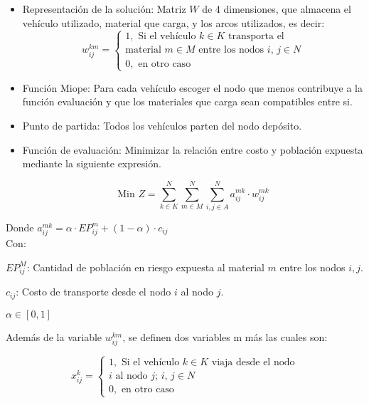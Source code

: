 \documentclass[conference]{IEEEtran}
\begin{document}
\begin{itemize}
    \item Representaci\'on de la soluci\'on: Matriz $W$ de 4 dimensiones, que almacena el veh\'iculo utilizado, material que carga, y los arcos utilizados, es decir:
   \\
   \begin{equation*}
        w^{km}_{ij} =     
    \begin{cases}
      1, \text{ Si el  veh\'iculo $k$} \in \text{$K$ transporta   el} \\  \text{material $m$} \in \text{$M$} \text{   entre los nodos $i$, $j$} \in \text{$N$}
      \\
      0, \text{ en otro caso}
    \end{cases}
    \end{equation*}
    \item Funci\'on Miope: Para cada veh\'iculo escoger el nodo que menos contribuye a la funci\'on evaluaci\'on y que los materiales que carga sean compatibles entre si.
    \item Punto de partida: Todos los veh\'iculos parten del nodo dep\'osito.
    \item Funci\'on de evaluaci\'on: Minimizar la relaci\'on entre costo y poblaci\'on expuesta mediante la siguiente expresi\'on.
    
    \begin{equation}
            \text{Min } Z = \sum_{k \in K}^N \sum_{m \in M}^N \sum_{i,j \in A}^N a^{mk}_{ij} \cdot w^{mk}_{ij}
    \end{equation}
\end{itemize}

Donde $a^{mk}_{ij} = \alpha \cdot EP^m_{ij} + (1 - \alpha) \cdot c_{ij} $
\\

Con:

$EP^M_{ij}$: Cantidad de poblaci\'on en riesgo expuesta al material $m$ entre los nodos $i, j$.

$c_{ij}$: Costo de transporte desde el nodo $i$ al nodo $j$.

$\alpha \in [0,1]$

Adem\'as de la variable $w^{km}_{ij}$, se definen dos variables m m\'as las cuales son:

\begin{equation*}
        x^{k}_{ij} =     
    \begin{cases}
      1, \text{ Si el  veh\'iculo $k$} \in \text{$K$ viaja desde el nodo}  \\ \text{$i$ al nodo $j$; $i$, $j$} \in \text{$N$}
      \\
      0, \text{ en otro caso}
    \end{cases}
    \end{equation*}
\end{document}
